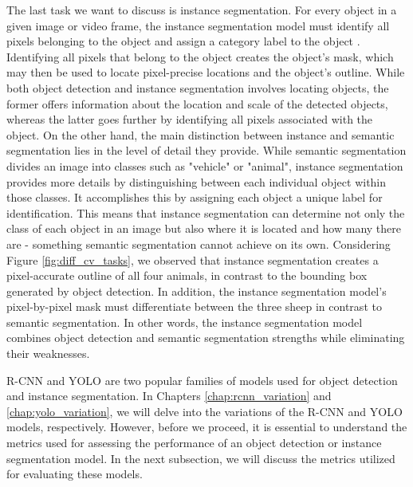 The last task we want to discuss is instance segmentation. For every object in a given image or video frame, the instance segmentation model must identify all pixels belonging to the object and assign a category label to the object \cite{overview_cv_task}. Identifying all pixels that belong to the object creates the object's mask, which may then be used to locate pixel-precise locations and the object's outline. While both object detection and instance segmentation involves locating objects, the former offers information about the location and scale of the detected objects, whereas the latter goes further by identifying all pixels associated with the object. On the other hand, the main distinction between instance and semantic segmentation lies in the level of detail they provide. While semantic segmentation divides an image into classes such as "vehicle" or "animal", instance segmentation provides more details by distinguishing between each individual object within those classes. It accomplishes this by assigning each object a unique label for identification. This means that instance segmentation can determine not only the class of each object in an image but also where it is located and how many there are - something semantic segmentation cannot achieve on its own. Considering Figure \ref{fig:diff_cv_tasks}, we observed that instance segmentation creates a pixel-accurate outline of all four animals, in contrast to the bounding box generated by object detection. In addition, the instance segmentation model's pixel-by-pixel mask must differentiate between the three sheep in contrast to semantic segmentation. In other words, the instance segmentation model combines object detection and semantic segmentation strengths while eliminating their weaknesses.
 
R-CNN and YOLO are two popular families of models used for object detection and instance segmentation. In Chapters \ref{chap:rcnn_variation} and \ref{chap:yolo_variation}, we will delve into the variations of the R-CNN and YOLO models, respectively. However, before we proceed, it is essential to understand the metrics used for assessing the performance of an object detection or instance segmentation model. In the next subsection, we will discuss the metrics utilized for evaluating these models.